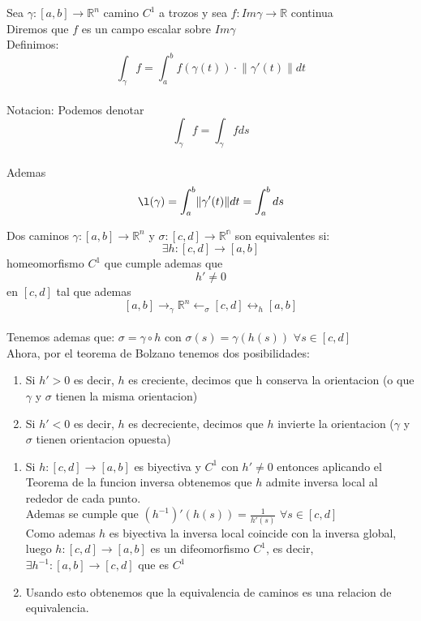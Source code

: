     \begin{definición}
    Sea $\gamma : [a,b] \to \mathbb{R}^n$ camino $C^1$ a trozos y sea $f:Im\gamma \to \mathbb{R}$ continua \\
    Diremos que $f$ es un campo escalar sobre $Im\gamma$ \\
    Definimos:
$$ \int_{\gamma} f = \int_{a}^{b} f(\gamma(t)) \cdot  \lVert \gamma'(t) \rVert dt$$ \\

    Notacion: Podemos denotar $$\int_{\gamma} f = \int_{\gamma} f ds$$ \\ Ademas
$$\l(\gamma) = \int_{a}^{b} \lVert \gamma'(t) \rVert dt = \int_{a}^{b} ds$$
    \end{definición}

    \begin{definición}
    Dos caminos $\gamma: [a,b] \to \mathbb{R}^n$ y $\sigma:[c,d] \to \mathbb{R^n}$ son equivalentes si: \\
$$ \exists h:[c,d] \to [a,b] $$ homeomorfismo $C^1$ que cumple ademas que \\
$$h' \neq 0$$ en $[c,d]$ tal que ademas $$[a,b] \to_{\gamma} \mathbb{R}^n \leftarrow_\sigma [c,d] \leftrightarrow_{h} [a,b]$$ \\
    Tenemos ademas que: $\sigma = \gamma \circ h$ con $\sigma(s) = \gamma(h(s))$ $\forall s \in [c,d]$ \\
    Ahora, por el teorema de Bolzano tenemos dos posibilidades:
    \begin{enumerate}
        \item Si $h'>0$ es decir, $h$ es creciente, decimos que h conserva la orientacion (o
              que $\gamma$ y $\sigma$ tienen la misma orientacion)
        \item Si $h'<0$ es decir, $h$ es decreciente, decimos que $h$ invierte la orientacion
              ($\gamma$ y $\sigma$ tienen orientacion opuesta)
    \end{enumerate}
    \end{definición}

    \begin{observación}
    \vspace{-2.5em}
    \begin{enumerate}
        \item Si $h:[c,d] \to [a,b]$ es biyectiva y $C^1$ con $h' \neq 0$ entonces aplicando
              el Teorema de la funcion inversa obtenemos que $h$ admite inversa local al
              rededor de cada punto. \\ Ademas se cumple que $(h^{-1})'(h(s)) =
                  \frac{1}{h'(s)}$ $\forall s \in [c,d]$ \\ Como ademas $h$ es biyectiva la
              inversa local coincide con la inversa global, luego $h:[c,d] \to [a,b]$ es un
              difeomorfismo $C^1$, es decir, $\exists h^{-1}:[a,b] \to [c,d]$ que es $C^1$
        \item Usando esto obtenemos que la equivalencia de caminos es una relacion de
              equivalencia.
    \end{enumerate}
    \end{observación}

